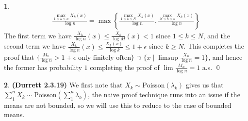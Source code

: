 \documentclass[10.5pt]{article}
\theoremstyle{definition}
\newtheorem{pb}{}
\newcommand{\set}[1]{\{#1\}}
\begin{document}
\begin{pb}
        \begin{align*}
            \frac{\max_{1 \leq k \leq n}X_k(x)}{\log n} = \max\left\{\frac{\max_{1 \leq k \leq N}X_k(x)}{\log n}, \frac{\max_{N \leq k \leq n}X_k(x)}{\log n}\right\}
        \end{align*}
        The first term we have \(\frac{X_k}{\log n}(x) \leq \frac{X_k}{\log M}(x) < 1\) since \(1 \leq k \leq N\), and the second term we have \(\frac{X_k}{\log n}(x) \leq \frac{X_k(x)}{\log k} \leq 1 + \epsilon\) since \(k \geq N\). This completes the proof that \(\set{\frac{M_n}{\log n} > 1 + \epsilon \text{ only finitely often}} \supset \set{x \mid \limsup \frac{X_n}{\log n} = 1}\), and hence the former has probability \(1\) completing the proof of \(\lim \frac{M_n}{\log n} = 1\) a.s. \qed
    \end{pb}
    \begin{pb} \textbf{(Durrett 2.3.19)}
        We first note that \(X_k \sim \text{Poisson}(\lambda_k)\) gives us that \(\sum_1^n X_k \sim \text{Poisson}(\sum_1^n \lambda_k)\), the naive proof technique runs into an issue if the means are not bounded, so we will use this to reduce to the case of bounded means.
    \end{pb}
\end{document}
